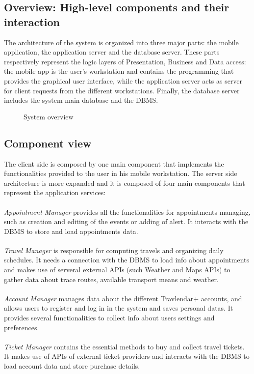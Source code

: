 \subsection{Overview: High-level components and their interaction}
The architecture of the system is organized into three major parts: the mobile application, the application server and the database server. These parts respectively represent the logic layers of Presentation, Business and Data access: the mobile app is the user’s workstation and contains the programming that provides the graphical user interface, while the application server acts as server for client requests from the different workstations. Finally, the database server includes the system main database and the DBMS.

\begin{figure}[!h]
	\centering
	\caption{System overview}
\end{figure}

\subsection{Component view}
The client side is composed by one main component that implements the functionalities provided to the user in his mobile workstation. The server side architecture is more expanded and it is composed of four main components that represent the application services:\\\\
\textit{Appointment Manager} provides all the functionalities for appointments managing, such as creation and editing of the events or adding of alert. It interacts with the DBMS to store and load appointments data.\\\\
\textit{Travel Manager} is responsible for computing travels and organizing daily schedules. It needs a connection with the DBMS to load info about appointments and makes use of serveral external APIs (such Weather and Maps APIs) to gather data about trace routes, available transport means and weather.\\\\
\textit{Account Manager} manages data about the different Travlendar+ accounts, and allows users to register and log in in the system and saves personal datas. It provides several functionalities to collect info about users settings and preferences.\\\\
\textit{Ticket Manager} contains the essential methods to buy and collect travel tickets. It makes use of APIs of external ticket providers and interacts with the DBMS to load account data and store purchase details.

